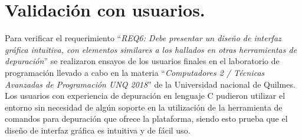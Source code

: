 \section{Validación con usuarios.}
\label{sec:Validación con usuarios.}

Para verificar el requerimiento “\emph{REQ6: Debe presentar un diseño de interfaz gráfica intuitiva, con elementos similares a los hallados en otras herramientas de depuración}” se realizaron ensayos de los usuarios finales en el laboratorio de programación llevado a cabo en la materia “\emph{Computadores 2 / Técnicas Avanzadas de Programación UNQ 2018}”\citep{computadores2unq2018} de la Universidad nacional de Quilmes. Los usuarios con experiencia de depuración en lenguaje C pudieron utilizar el entorno sin necesidad de algún soporte en la utilización de la herramienta de comandos para depuración que ofrece la plataforma, siendo esto prueba que el diseño de interfaz gráfica es intuitiva y de fácil uso.
